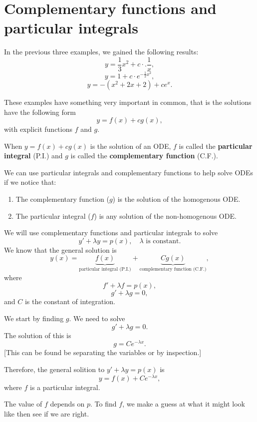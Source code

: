\section{Complementary functions and particular integrals}

In the previous three examples, we gained the following results:
\[y=\frac{1}{3}x^2+c\cdot.\frac{1}{x},\]
\[y=1+c\cdot e^{-\frac{1}{2}x^2},\]
\[y=-(x^2+2x+2)+ce^x.\]

These examples have something very important in common, that is the solutions have the following form
\[y=f(x)+cg(x),\]
with explicit functions $f$ and $g$.

\begin{definition}
When \(y=f(x) + cg(x)\) is the solution of an ODE, \(f\) is called the \textbf{particular integral} (P.I.) and \(g\) is called the \textbf{complementary function} (C.F.).
\end{definition}

We can use particular integrals and complementary functions to help solve ODEs if we notice that:
\begin{enumerate}
\item The complementary function ($g$) is the solution of the homogenous ODE.
\item The particular integral ($f$) is any solution of the non-homogenous ODE.
\end{enumerate}

\begin{example}
We will use complementary functions and particular integrals to solve
\[y'+\lambda y=p(x),\quad \lambda \text{ is constant.}\]
We know that the general solution is 
\[y(x)=\underbrace{f(x)}_{\text{particular integral (P.I.)}}+\underbrace{Cg(x)}_{\text{complementary function (C.F.)}},\]
where
\[f'+\lambda f=p(x),\]\[g'+\lambda g=0,\]
and $C$ is the constant of integration.

We start by finding $g$. We need to solve
\[g'+\lambda g=0.\]
The solution of this is
\[g=Ce^{-\lambda x}.\]
[This can be found be separating the variables or by inspection.]

Therefore, the general solition to $y'+\lambda y=p(x)$ is
\[y=f(x)+Ce^{-\lambda x},\]
where $f$ is a particular integral.
\end{example}

The value of $f$ depends on $p$. To find $f$, we make a guess at what it might look like then see if we are right.

